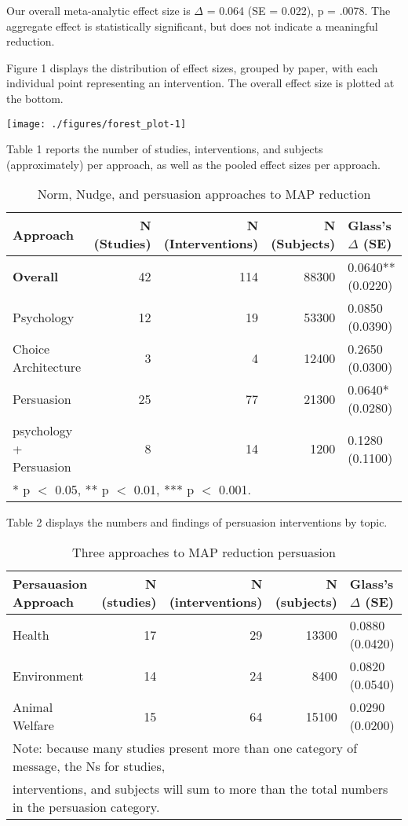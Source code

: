 \documentclass[sn-nature,pdflatex]{sn-jnl}
\begin{document}
Our overall meta-analytic effect size is \(\Delta\) = 0.064 (SE =
0.022), p = .0078. The aggregate effect is statistically significant,
but does not indicate a meaningful reduction.

Figure 1 displays the distribution of effect sizes, grouped by paper,
with each individual point representing an intervention. The overall
effect size is plotted at the bottom.

\texttt{[image: ./figures/forest\_plot-1]}

Table 1 reports the number of studies, interventions, and subjects
(approximately) per approach, as well as the pooled effect sizes per
approach.

\begin{table}[!h]
\centering
\caption{\label{tab:table_one}Norm, Nudge, and persuasion approaches to MAP reduction}
\centering
\begin{tabular}[t]{lrrrl}
\toprule
Approach & N (Studies) & N (Interventions) & N (Subjects) & Glass's $\Delta$ (SE)\\
\midrule
\textbf{Overall} & 42 & 114 & 88300 & 0.0640** (0.0220)\\
Psychology & 12 & 19 & 53300 & 0.0850 (0.0390)\\
Choice Architecture & 3 & 4 & 12400 & 0.2650 (0.0300)\\
Persuasion & 25 & 77 & 21300 & 0.0640* (0.0280)\\
psychology + Persuasion & 8 & 14 & 1200 & 0.1280 (0.1100)\\
\bottomrule
\multicolumn{5}{l}{\rule{0pt}{1em}* p $<$ 0.05, ** p $<$ 0.01, *** p $<$ 0.001.}\\
\end{tabular}
\end{table}

Table 2 displays the numbers and findings of persuasion interventions by
topic.

\begin{table}[!h]
\centering
\caption{\label{tab:table_two}Three approaches to MAP reduction persuasion}
\centering
\begin{tabular}[t]{lrrrl}
\toprule
Persauasion Approach & N (studies) & N (interventions) & N (subjects) & Glass's $\Delta$ (SE)\\
\midrule
Health & 17 & 29 & 13300 & 0.0880 (0.0420)\\
Environment & 14 & 24 & 8400 & 0.0820 (0.0540)\\
Animal Welfare & 15 & 64 & 15100 & 0.0290 (0.0200)\\
\bottomrule
\multicolumn{5}{l}{\textsuperscript{} Note: because many studies present more than one category of message, the Ns for studies, \linebreak}\\
\multicolumn{5}{l}{interventions, and subjects will sum to more than the total numbers in the persuasion category.}\\
\end{tabular}
\end{table}
\end{document}

